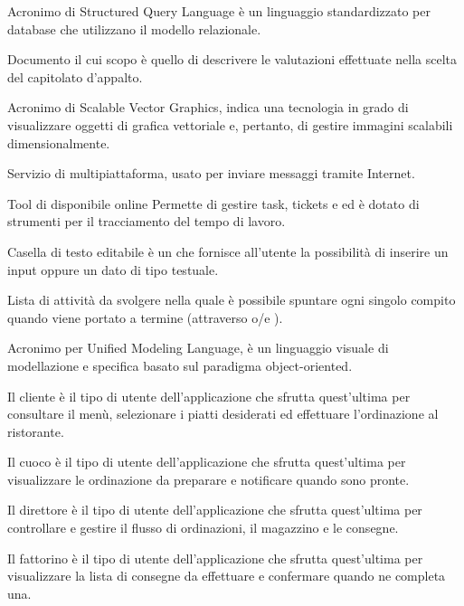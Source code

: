 Acronimo di Structured Query Language \`e un linguaggio standardizzato per database che utilizzano il modello relazionale.

Documento il cui scopo è quello di descrivere le valutazioni effettuate nella scelta del capitolato d’appalto.

Acronimo di Scalable Vector Graphics, indica una tecnologia in grado di visualizzare oggetti di grafica vettoriale e, pertanto, di gestire immagini scalabili dimensionalmente.
\clearpage

Servizio di  multipiattaforma, usato per inviare messaggi tramite Internet. 

Tool di  disponibile online 
Permette di gestire  task, tickets e  ed è dotato di strumenti per il tracciamento del tempo di lavoro.

Casella di testo editabile è un  che fornisce all’utente la possibilità di inserire un input oppure un dato di tipo testuale.

Lista di attività da svolgere nella quale è possibile spuntare ogni singolo compito quando viene portato a termine (attraverso  o/e ).
\clearpage

Acronimo per Unified Modeling Language, è un linguaggio visuale di modellazione e specifica basato sul paradigma object-oriented.

Il cliente è il tipo di utente dell’applicazione che sfrutta quest’ultima per consultare il menù, selezionare i piatti desiderati ed effettuare l’ordinazione al ristorante.

Il cuoco è il tipo di utente dell’applicazione che sfrutta quest’ultima per visualizzare le ordinazione da preparare e notificare quando sono pronte.

Il direttore è il tipo di utente dell’applicazione che sfrutta quest’ultima per controllare e gestire il flusso di ordinazioni, il magazzino e le consegne.

Il fattorino è il tipo di utente dell’applicazione che sfrutta quest’ultima per visualizzare la lista di consegne da effettuare e confermare quando ne completa una.

